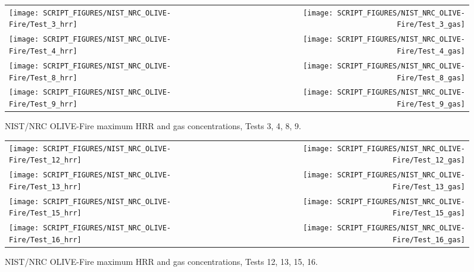 \begin{figure}[p]
\begin{tabular*}{\textwidth}{l@{\extracolsep{\fill}}r}
\texttt{[image: SCRIPT\_FIGURES/NIST\_NRC\_OLIVE-Fire/Test\_3\_hrr]} &
\texttt{[image: SCRIPT\_FIGURES/NIST\_NRC\_OLIVE-Fire/Test\_3\_gas]} \\
\texttt{[image: SCRIPT\_FIGURES/NIST\_NRC\_OLIVE-Fire/Test\_4\_hrr]} &
\texttt{[image: SCRIPT\_FIGURES/NIST\_NRC\_OLIVE-Fire/Test\_4\_gas]} \\
\texttt{[image: SCRIPT\_FIGURES/NIST\_NRC\_OLIVE-Fire/Test\_8\_hrr]} &
\texttt{[image: SCRIPT\_FIGURES/NIST\_NRC\_OLIVE-Fire/Test\_8\_gas]} \\
\texttt{[image: SCRIPT\_FIGURES/NIST\_NRC\_OLIVE-Fire/Test\_9\_hrr]} &
\texttt{[image: SCRIPT\_FIGURES/NIST\_NRC\_OLIVE-Fire/Test\_9\_gas]}
\end{tabular*}
\caption[NIST/NRC OLIVE-Fire maximum HRR and gas concentrations, Tests 3, 4, 8, 9]
{NIST/NRC OLIVE-Fire maximum HRR and gas concentrations, Tests 3, 4, 8, 9.}
\label{NIST_NRC_HRR_1}
\end{figure}

\begin{figure}[p]
\begin{tabular*}{\textwidth}{l@{\extracolsep{\fill}}r}
\texttt{[image: SCRIPT\_FIGURES/NIST\_NRC\_OLIVE-Fire/Test\_12\_hrr]} &
\texttt{[image: SCRIPT\_FIGURES/NIST\_NRC\_OLIVE-Fire/Test\_12\_gas]} \\
\texttt{[image: SCRIPT\_FIGURES/NIST\_NRC\_OLIVE-Fire/Test\_13\_hrr]} &
\texttt{[image: SCRIPT\_FIGURES/NIST\_NRC\_OLIVE-Fire/Test\_13\_gas]} \\
\texttt{[image: SCRIPT\_FIGURES/NIST\_NRC\_OLIVE-Fire/Test\_15\_hrr]} &
\texttt{[image: SCRIPT\_FIGURES/NIST\_NRC\_OLIVE-Fire/Test\_15\_gas]} \\
\texttt{[image: SCRIPT\_FIGURES/NIST\_NRC\_OLIVE-Fire/Test\_16\_hrr]} &
\texttt{[image: SCRIPT\_FIGURES/NIST\_NRC\_OLIVE-Fire/Test\_16\_gas]}
\end{tabular*}
\caption[NIST/NRC OLIVE-Fire maximum HRR and gas concentrations, Tests 12, 13, 15, 16]
{NIST/NRC OLIVE-Fire maximum HRR and gas concentrations, Tests 12, 13, 15, 16.}
\label{NIST_NRC_HRR_2}
\end{figure}

